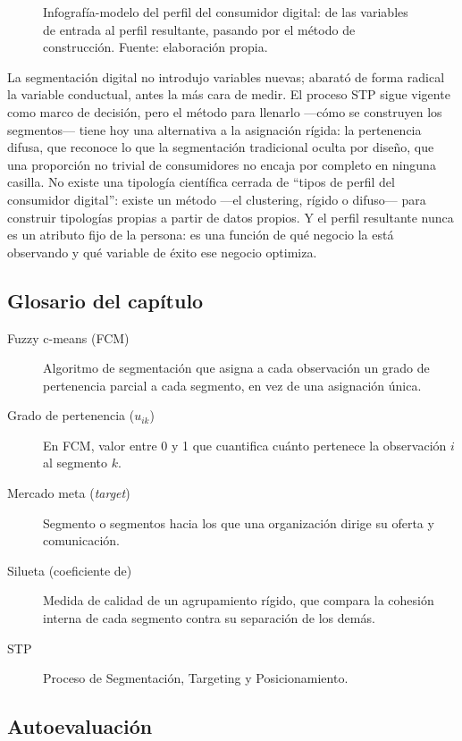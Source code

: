 \begin{figure}[htbp]
  \centering
  
  \caption{Infografía-modelo del perfil del consumidor digital: de las
  variables de entrada al perfil resultante, pasando por el método de
  construcción. Fuente: elaboración propia.}
  \label{fig:parte1-infografia-perfil}
\end{figure}

La segmentación digital no introdujo variables nuevas; abarató de forma
radical la variable conductual, antes la más cara de medir. El proceso STP
sigue vigente como marco de decisión, pero el método para llenarlo —cómo se
construyen los segmentos— tiene hoy una alternativa a la asignación rígida:
la pertenencia difusa, que reconoce lo que la segmentación tradicional
oculta por diseño, que una proporción no trivial de consumidores no encaja
por completo en ninguna casilla. No existe una tipología científica cerrada
de \enquote{tipos de perfil del consumidor digital}: existe un método —el
clustering, rígido o difuso— para construir tipologías propias a partir de
datos propios. Y el perfil resultante nunca es un atributo fijo de la
persona: es una función de qué negocio la está observando y qué variable de
éxito ese negocio optimiza.

\subsection*{Glosario del capítulo}
\begin{description}
  \item[Fuzzy c-means (FCM)] Algoritmo de segmentación que asigna a cada
  observación un grado de pertenencia parcial a cada segmento, en vez de una
  asignación única.
  \item[Grado de pertenencia ($u_{ik}$)] En FCM, valor entre 0 y 1 que
  cuantifica cuánto pertenece la observación $i$ al segmento $k$.
  \item[Mercado meta (\textit{target})] Segmento o segmentos hacia los que
  una organización dirige su oferta y comunicación.
  \item[Silueta (coeficiente de)] Medida de calidad de un agrupamiento
  rígido, que compara la cohesión interna de cada segmento contra su
  separación de los demás.
  \item[STP] Proceso de Segmentación, Targeting y Posicionamiento.
\end{description}

\subsection*{Autoevaluación}

